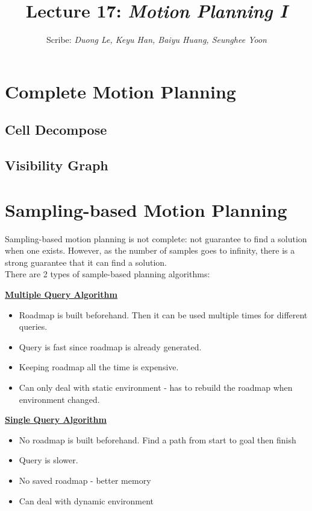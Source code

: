 \documentclass[11pt]{article}
\title{Lecture 17: \it{Motion Planning I}}
\author{Scribe:  \it{Duong Le, Keyu Han, Baiyu Huang, Seunghee Yoon}}
\date{}
\begin{document}
\maketitle
\thispagestyle{fancy}
\section{Complete Motion Planning}
\subsection{Cell Decompose}
\subsection{Visibility Graph}
\section{Sampling-based Motion Planning}
Sampling-based motion planning is not complete: not guarantee to find a solution when one exists. However, as the number of samples goes to infinity, there is a strong guarantee that it can find a solution.\\
There are 2 types of sample-based planning algorithms:\\
\begin{multicols*}{2}
\textbf{\underline{Multiple Query Algorithm}}
\begin{itemize}
\item Roadmap is built beforehand. Then it can be used multiple times for different queries.
\item Query is fast since roadmap is already generated.
\item Keeping roadmap all the time is expensive.
\item Can only deal with static environment - has to rebuild the roadmap when environment changed.
\end{itemize}
\vfill\null
\columnbreak
\textbf{\underline{Single Query Algorithm}}
\begin{itemize}
\item No roadmap is built beforehand. Find a path from start to goal then finish
\item Query is slower.\\
\item No saved roadmap - better memory \\
\item Can deal with dynamic environment 
\end{itemize}
\end{multicols*}
\end{document}
